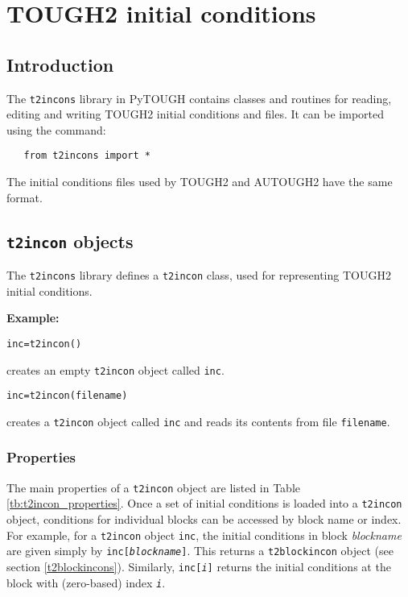 \chapter{TOUGH2 initial conditions}
\label{incons}

\section{Introduction}
The \texttt{t2incons} library in PyTOUGH contains classes and routines for reading, editing and writing TOUGH2 initial conditions and files.  It can be imported using the command:

\begin{verbatim}
   from t2incons import *
\end{verbatim}

The initial conditions files used by TOUGH2 and AUTOUGH2 have the same format.

\section{\texttt{t2incon} objects}

The \texttt{t2incons} library defines a \texttt{t2incon} class, used for representing TOUGH2 initial conditions.

\textbf{Example:}

\begin{verbatim}
inc=t2incon()
\end{verbatim}

creates an empty \texttt{t2incon} object called \texttt{inc}.

\begin{verbatim}
inc=t2incon(filename)
\end{verbatim}

creates a \texttt{t2incon} object called \texttt{inc} and reads its contents from file \texttt{filename}.

\subsection{Properties}

The main properties of a \texttt{t2incon} object are listed in Table \ref{tb:t2incon_properties}.  Once a set of initial conditions is loaded into a \texttt{t2incon} object, conditions for individual blocks can be accessed by block name or index.  For example, for a \texttt{t2incon} object \texttt{inc}, the initial conditions in block \emph{blockname} are given simply by \texttt{inc[\emph{blockname}]}.  This returns a \texttt{t2blockincon} object (see section \ref{t2blockincons}).  Similarly, \texttt{inc[\emph{i}]} returns the initial conditions at the block with (zero-based) index \texttt{\emph{i}}.

